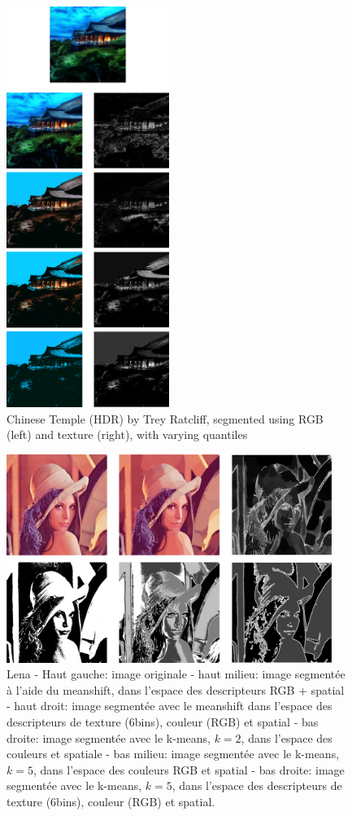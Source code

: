 \documentclass{article}
\begin{document}
\begin{figure}[h]
\begin{center}
\includegraphics[width=200px]{images/all_chinese_temple.png}
\end{center}
\caption{Chinese Temple (HDR) by Trey Ratcliff, segmented using RGB (left) and
texture (right), with varying quantiles}
\end{figure}

\begin{figure}[h]
\label{lena}
\includegraphics[width=400px]{images/all_lena.png}
\caption{Lena - Haut gauche: image originale - haut milieu: image segmentée à
l'aide du meanshift, dans l'espace des descripteurs RGB + spatial - haut
droit: image segmentée avec le meanshift dans l'espace des descripteurs de
texture (6bins), couleur (RGB) et spatial - bas droite: image segmentée
avec le k-means, $k = 2$, dans l'espace des couleurs et spatiale - bas milieu:
image segmentée avec le k-means, $k = 5$, dans l'espace des couleurs RGB et
spatial - bas droite: image segmentée avec le k-means, $k = 5$, dans l'espace
des descripteurs de texture (6bins), couleur (RGB) et spatial.}
\end{figure}
\end{document}
